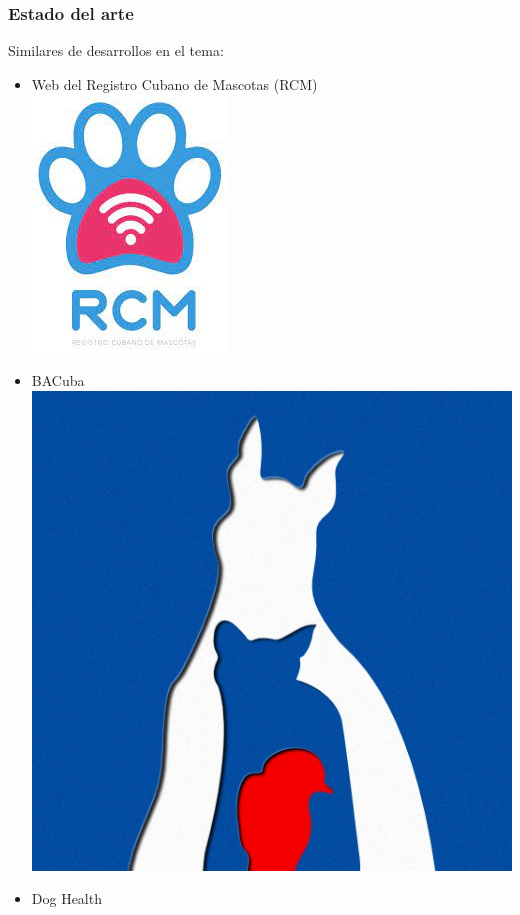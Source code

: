 \documentclass[14pt]{beamer}
\begin{document}
\begin{frame}
\frametitle{Estado del arte}
Similares de desarrollos en el tema:
\begin{itemize}
\item Web del Registro Cubano de Mascotas (RCM)
\includegraphics[scale =0.2]{Images/RCM.jpg}
\item  BACuba \\
\includegraphics[scale =0.08]{Images/BAC.jpg}
\item  Dog Health\\

\end{itemize}
\end{frame}
\end{document}

